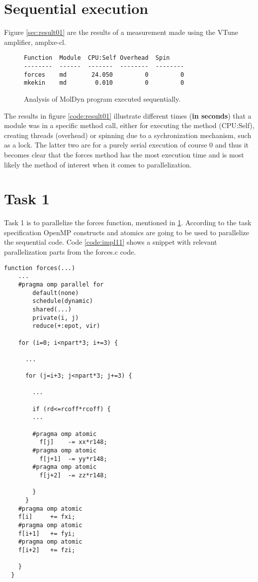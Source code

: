 \documentclass[journal]{IEEEtran}
\begin{document}
\section{Sequential execution}
\label{sec:sequential}
Figure \ref{sec:result01} are the results of a measurement made using the VTune amplifier, amplxe-cl.

\begin{figure}[here]
  \begin{lstlisting}[style=bash]
Function  Module  CPU:Self Overhead  Spin
--------  ------  -------  --------  --------
forces    md       24.050         0         0
mkekin    md        0.010         0         0
  \end{lstlisting}
  \caption{Analysis of MolDyn program executed sequentially.}
  \label{fig:result01}
\end{figure}

The results in figure \ref{code:result01} illustrate different times (\textbf{in seconds}) that a module was in a specific method call, either for executing the method (CPU:Self), creating threads (overhead) or spinning due to a sychronization mechanism, such as a lock. The latter two are for a purely serial execution of course 0 and thus it becomes clear that the forces method has the most execution time and is most likely the method of interest when it comes to parallelization.

\section{Task 1}
Task 1 is to parallelize the forces function, mentioned in \ref{sec:sequential}. According to the task specification OpenMP constructs and atomics are going to be used to parallelize the sequential code. Code \ref{code:impl11} shows a snippet with relevant parallelization parts from the forces.c code.

\begin{code}[here]
  \begin{lstlisting}[style=c++]
  function forces(...)
    ...
    #pragma omp parallel for 
    	default(none) 
        schedule(dynamic)
        shared(...) 
        private(i, j) 
        reduce(+:epot, vir)

    for (i=0; i<npart*3; i+=3) {

	  ...
      
      for (j=i+3; j<npart*3; j+=3) {

        ...

        if (rd<=rcoff*rcoff) {
		...
          
        #pragma omp atomic
          f[j]    -= xx*r148;
        #pragma omp atomic
          f[j+1]  -= yy*r148;
        #pragma omp atomic
          f[j+2]  -= zz*r148;

        }
      }
	#pragma omp atomic
	f[i]     += fxi;
  	#pragma omp atomic
	f[i+1]   += fyi;
  	#pragma omp atomic
	f[i+2]   += fzi;

    }
  }
  \end{lstlisting}
  \caption{Task 1: parallel implementation}
  \label{code:impl11}
\end{code}
\end{document}
